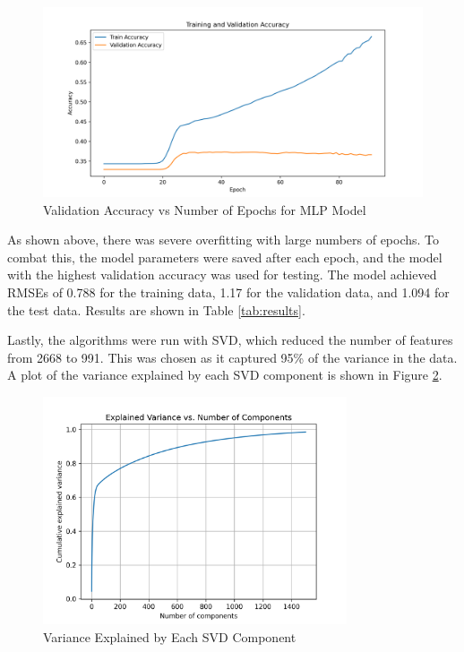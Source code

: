 \documentclass[12pt]{article}
\begin{document}
\begin{figure}[H]
    \centering
    \includegraphics[width=1\textwidth]{Images/accuracy_curves_noSVD.png}
    \caption{Validation Accuracy vs Number of Epochs for MLP Model}
    \label{fig:mlp_val_acc}
\end{figure}

As shown above, there was severe overfitting with large 
numbers of epochs.
To combat this, the model parameters were saved after each epoch,
and the model with the highest validation accuracy was used for testing.
The model achieved RMSEs of 0.788 for the training data, 1.17 
for the validation data, and 1.094 for the test data. 
Results are shown in Table \ref{tab:results}.


Lastly, the algorithms were run with SVD, which reduced the 
number of features from 2668 to 991. This was chosen as it captured 95\%
of the variance in the data. A plot of the variance explained by each
SVD component is shown in Figure \ref{fig:svd_variance}.
\begin{figure}[H]
    \centering
    \includegraphics[width=0.8\textwidth]{Images/SVDPlot.png}
    \caption{Variance Explained by Each SVD Component}
    \label{fig:svd_variance}
\end{figure}
\end{document}
